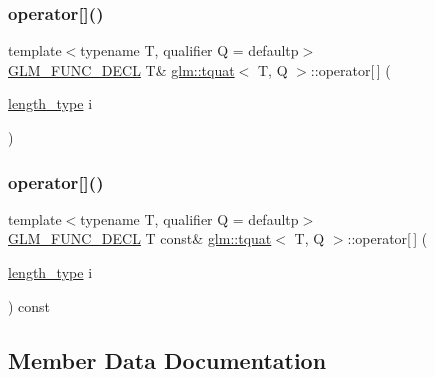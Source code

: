 \mbox{\label{structglm_1_1tquat_a0676fa7abe008f2912d296f6b3a569cf}} 
\subsubsection{\texorpdfstring{operator[]()}{operator[]()}\hspace{0.1cm}{\footnotesize\ttfamily [1/2]}}
{\footnotesize\ttfamily template$<$typename T, qualifier Q = defaultp$>$ \\
\hyperlink{setup_8hpp_ab2d052de21a70539923e9bcbf6e83a51}{G\+L\+M\+\_\+\+F\+U\+N\+C\+\_\+\+D\+E\+CL} T\& \hyperlink{structglm_1_1tquat}{glm\+::tquat}$<$ T, Q $>$\+::operator\mbox{[}$\,$\mbox{]} (\begin{DoxyParamCaption}\item[{\hyperlink{structglm_1_1tquat_a6d9ab28781d7835b30216a996484c026}{length\+\_\+type}}]{i }\end{DoxyParamCaption})}

\mbox{\label{structglm_1_1tquat_a88fc5911dc554c71f5933d2fb99a7a7a}} 
\subsubsection{\texorpdfstring{operator[]()}{operator[]()}\hspace{0.1cm}{\footnotesize\ttfamily [2/2]}}
{\footnotesize\ttfamily template$<$typename T, qualifier Q = defaultp$>$ \\
\hyperlink{setup_8hpp_ab2d052de21a70539923e9bcbf6e83a51}{G\+L\+M\+\_\+\+F\+U\+N\+C\+\_\+\+D\+E\+CL} T const\& \hyperlink{structglm_1_1tquat}{glm\+::tquat}$<$ T, Q $>$\+::operator\mbox{[}$\,$\mbox{]} (\begin{DoxyParamCaption}\item[{\hyperlink{structglm_1_1tquat_a6d9ab28781d7835b30216a996484c026}{length\+\_\+type}}]{i }\end{DoxyParamCaption}) const}



\subsection{Member Data Documentation}
\mbox{\label{structglm_1_1tquat_a7e71715c0eb0b1cd8de24fc5012594bf}} 
